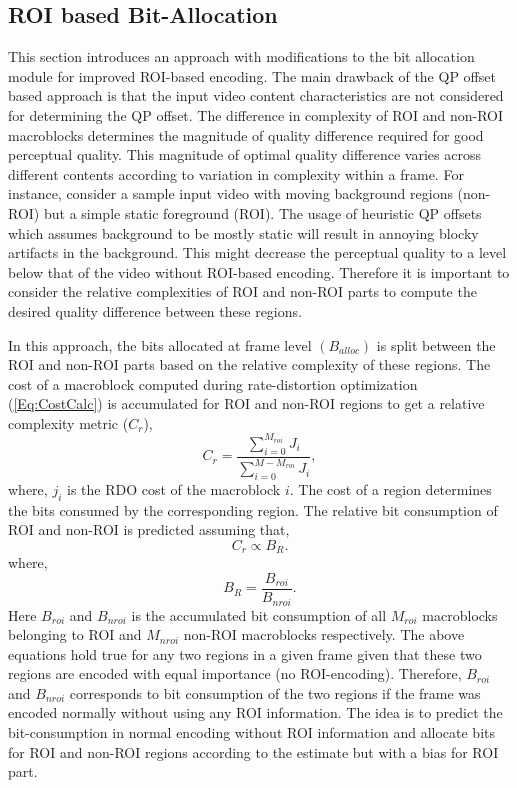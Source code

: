 \documentclass[11pt]{article} %
\begin{document}
\subsection{ROI based Bit-Allocation}
This section introduces an approach with modifications to the bit allocation module for improved ROI-based encoding. The main drawback of the QP offset based approach is that the input video content characteristics are not considered for determining the QP offset. The difference in complexity of ROI and non-ROI macroblocks determines the magnitude of quality difference required for good perceptual quality. This magnitude of optimal quality difference varies across different contents according to variation in complexity within a frame. For instance, consider a sample input video with moving background regions (non-ROI) but a simple static foreground (ROI). The usage of heuristic QP offsets which assumes background to be mostly static will result in annoying blocky artifacts in the background. This might decrease the perceptual quality to a level below that of the video without ROI-based encoding. Therefore it is important to consider the relative complexities of ROI and non-ROI parts to compute the desired quality difference between these regions.

In this approach, the bits allocated at frame level $(B_{alloc})$ is split between the ROI and non-ROI parts based on the relative complexity of these regions. The cost of a macroblock computed during rate-distortion optimization (\ref{Eq:CostCalc}) is accumulated for ROI and non-ROI regions to get a relative complexity metric ($C_r$),
$$C_r = \frac{\sum_{i =0}^{M_{roi}}{J_i}}{\sum_{i =0}^{M-M_{roi}}{J_i}},$$
where, $j_i$ is the RDO cost of the macroblock $i$. The cost of a region determines the bits consumed by the corresponding region. The relative bit consumption of ROI and non-ROI is predicted assuming that,
\begin{equation}
\label{Eq:Relative bit consumption}
	C_r \propto B_R.
\end{equation}
where, $$B_R = \frac{B_{roi}}{B_{nroi}}.$$
Here $B_{roi}$ and $B_{nroi}$ is the accumulated bit consumption of all $M_{roi}$ macroblocks belonging to ROI and  $M_{nroi}$ non-ROI macroblocks respectively. The above equations hold true for any two regions in a given frame given that these two regions are encoded with equal importance (no ROI-encoding). Therefore, $B_{roi}$ and $B_{nroi}$ corresponds to bit consumption of the two regions if the frame was encoded normally without using any ROI information. The idea is to predict the bit-consumption in normal encoding without ROI information and allocate bits for ROI and non-ROI regions according to the estimate but with a bias for ROI part. 
 
\end{document}
